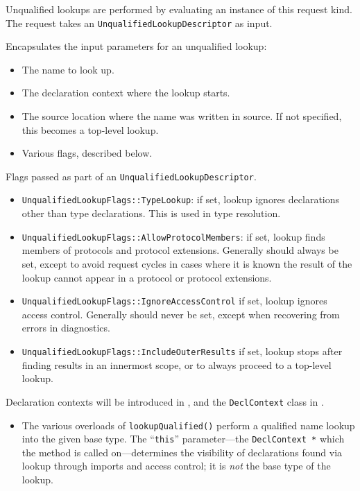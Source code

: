 \documentclass[../generics]{subfiles}
\begin{document}
Unqualified lookups are performed by evaluating an instance of this request kind. The request takes an \texttt{UnqualifiedLookupDescriptor} as input.

Encapsulates the input parameters for an unqualified lookup:
\begin{itemize}
\item The name to look up.
\item The declaration context where the lookup starts.
\item The source location where the name was written in source. If not specified, this becomes a top-level lookup.
\item Various flags, described below.
\end{itemize}

Flags passed as part of an \texttt{UnqualifiedLookupDescriptor}.
\begin{itemize}
\item \texttt{UnqualifiedLookupFlags::TypeLookup}: if set, lookup ignores declarations other than type declarations. This is used in type resolution.
\item \texttt{UnqualifiedLookupFlags::AllowProtocolMembers}: if set, lookup finds members of protocols and protocol extensions. Generally should always be set, except to avoid request cycles in cases where it is known the result of the lookup cannot appear in a protocol or protocol extensions.
\item \texttt{UnqualifiedLookupFlags::IgnoreAccessControl} if set, lookup ignores access control. Generally should never be set, except when recovering from errors in diagnostics.
\item \texttt{UnqualifiedLookupFlags::IncludeOuterResults} if set, lookup stops after finding results in an innermost scope, or to always proceed to a top-level lookup.
\end{itemize}

Declaration contexts will be introduced in , and the \texttt{DeclContext} class in .
\begin{itemize}
\item The various overloads of \texttt{lookupQualified()} perform a qualified name lookup into the given base type. The ``\texttt{this}'' parameter---the \texttt{DeclContext~*} which the method is called on---determines the visibility of declarations found via lookup through imports and access control; it is \emph{not} the base type of the lookup.
\end{itemize}
\end{document}
